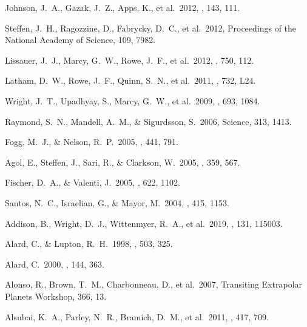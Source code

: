  Johnson, J.~A., Gazak, J.~Z., Apps, K., et al.\ 2012, \aj, 143, 111.

 Steffen, J.~H., Ragozzine, D., Fabrycky, D.~C., et al.\ 2012, Proceedings of the National Academy of Science, 109, 7982.

 Lissauer, J.~J., Marcy, G.~W., Rowe, J.~F., et al.\ 2012, \apj, 750, 112.

 Latham, D.~W., Rowe, J.~F., Quinn, S.~N., et al.\ 2011, \apjl, 732, L24.


 Wright, J.~T., Upadhyay, S., Marcy, G.~W., et al.\ 2009, \apj, 693, 1084.

 Raymond, S.~N., Mandell, A.~M., \& Sigurdsson, S.\ 2006, Science, 313, 1413.

 Fogg, M.~J., \& Nelson, R.~P.\ 2005, \aap, 441, 791.

 Agol, E., Steffen, J., Sari, R., \& Clarkson, W.\ 2005, \mnras, 359, 567.

 Fischer, D.~A., \& Valenti, J.\ 2005, \apj, 622, 1102.

 Santos, N.~C., Israelian, G., \& Mayor, M.\ 2004, \aap, 415, 1153.







 Addison, B., Wright, D.~J., Wittenmyer, R.~A., et al.\ 2019, \pasp, 131, 115003.

 Alard, C., \& Lupton, R.~H.\ 1998, \apj, 503, 325.

 Alard, C.\ 2000, \aaps, 144, 363.

 Alonso, R., Brown, T.~M., Charbonneau, D., et al.\ 2007, Transiting Extrapolar Planets Workshop, 366, 13.

 Alsubai, K.~A., Parley, N.~R., Bramich, D.~M., et al.\ 2011, \mnras, 417, 709.

